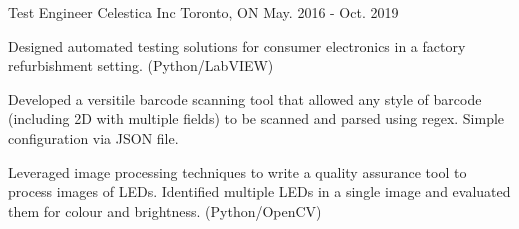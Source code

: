 \begin{cventries}
  \cventry
    {Test Engineer} %
    {Celestica Inc} %
    {Toronto, ON} %
    {May. 2016 - Oct. 2019} %
    {
      \begin{cvitems} %
        \item {Designed automated testing solutions for consumer electronics in a factory refurbishment setting. (Python/LabVIEW)}
        \item {Developed a versitile barcode scanning tool that allowed any style of barcode (including 2D with multiple fields) to be scanned and parsed using regex. Simple configuration via JSON file.}
        \item {Leveraged image processing techniques to write a quality assurance tool to process images of LEDs. Identified multiple LEDs in a single image and evaluated them for colour and brightness. (Python/OpenCV)}
      \end{cvitems}
    }

\end{cventries}

